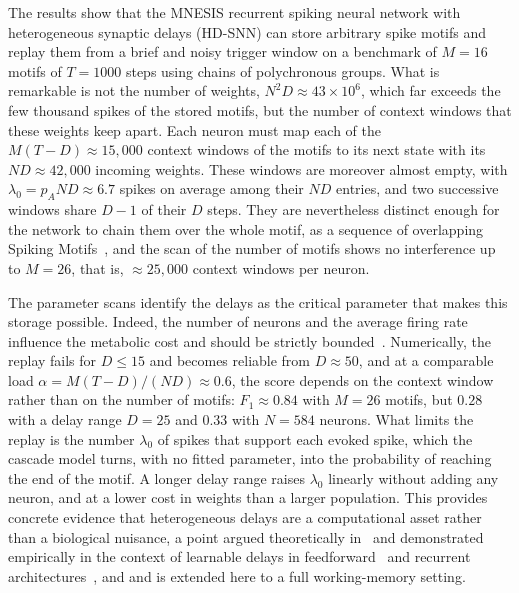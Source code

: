 \documentclass{scrartcl}
\newcommand{\citep}[1]{\parencite{#1}}
\newcommand{\citet}[1]{\textcite{#1}}
\begin{document}
The results show that the MNESIS recurrent spiking neural network with heterogeneous synaptic delays (HD-SNN) can store arbitrary spike motifs and replay them from a brief and noisy trigger window on a benchmark of $M=16$ motifs of $T=1000$ steps using chains of polychronous groups. What is remarkable is not the number of weights, $N^2 D \approx 43 \times 10^6$, which far exceeds the few thousand spikes of the stored motifs, but the number of context windows that these weights keep apart. Each neuron must map each of the $M(T-D) \approx 15{,}000$ context windows of the motifs to its next state with its $N D \approx 42{,}000$ incoming weights. These windows are moreover almost empty, with $\lambda_0 = p_A N D \approx 6.7$ spikes on average among their $N D$ entries, and two successive windows share $D - 1$ of their $D$ steps. They are nevertheless distinct enough for the network to chain them over the whole motif, as a sequence of overlapping Spiking Motifs~\citep{Perrinet2023,Kronland-Martinet2026}, and the scan of the number of motifs shows no interference up to $M = 26$, that is, $\approx 25{,}000$ context windows per neuron.

The parameter scans identify the delays as the critical parameter that makes this storage possible. Indeed, the number of neurons and the average firing rate influence the metabolic cost and should be strictly bounded~\citep{Lennie2003}. Numerically, the replay fails for $D \leq 15$ and becomes reliable from $D \approx 50$, and at a comparable load $\alpha = M(T-D)/(ND) \approx 0.6$, the score depends on the context window rather than on the number of motifs: $F_1 \approx 0.84$ with $M = 26$ motifs, but $0.28$ with a delay range $D = 25$ and $0.33$ with $N = 584$ neurons. What limits the replay is the number $\lambda_0$ of spikes that support each evoked spike, which the cascade model turns, with no fitted parameter, into the probability of reaching the end of the motif. A longer delay range raises $\lambda_0$ linearly without adding any neuron, and at a lower cost in weights than a larger population. This provides concrete evidence that heterogeneous delays are a computational asset rather than a biological nuisance, a point argued theoretically in~\citet{Izhikevich2006} and demonstrated empirically in the context of learnable delays in feedforward~\citep{Grimaldi2023a,Hammouamri2023} and recurrent architectures~\citep{Queant2025,Meszaros2025}, and and is extended here to a full working-memory setting.
\end{document}
